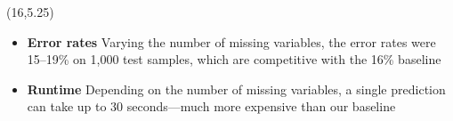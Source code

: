 \documentclass[a0]{a0poster}
\begin{document}
\begin{textblock}{7.0}(16,5.25)

\begin{itemize}

  \item \textbf{Error rates} Varying the number of missing variables, the error rates were 15--19\% on 1,000 test samples, which are competitive with the 16\% baseline

  \item \textbf{Runtime} Depending on the number of missing variables, a single prediction can take up to 30 seconds---much more expensive than our baseline

\end{itemize}

\end{textblock}
\end{document}
